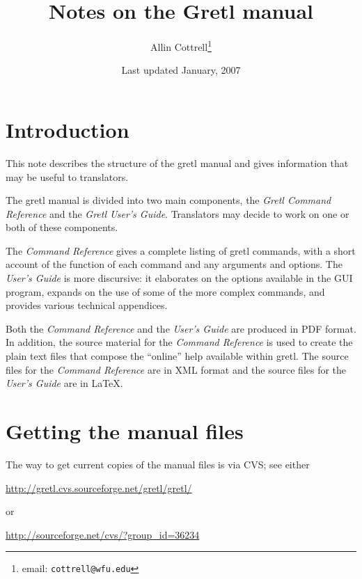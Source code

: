 \documentclass{article}
\begin{document}
\title{Notes on the Gretl manual}
\author{Allin Cottrell\thanks{email: \texttt{cottrell@wfu.edu}}}
\date{Last updated January, 2007}

\maketitle

\setcounter{tocdepth}{1}
\tableofcontents

\section{Introduction}

This note describes the structure of the \textsf{gretl} manual and
gives information that may be useful to translators.

The gretl manual is divided into two main components, the
\textit{Gretl Command Reference} and the \textit{Gretl User's Guide}.
Translators may decide to work on one or both of these components.

The \textit{Command Reference} gives a complete listing of
\textsf{gretl} commands, with a short account of the function of each
command and any arguments and options.  The \textit{User's Guide} is
more discursive: it elaborates on the options available in the GUI
program, expands on the use of some of the more complex commands, and
provides various technical appendices.

Both the \textit{Command Reference} and the \textit{User's Guide} are
produced in PDF format.  In addition, the source material for the
\textit{Command Reference} is used to create the plain text files that
compose the ``online'' help available within \textsf{gretl}.  The
source files for the \textit{Command Reference} are in XML format and
the source files for the \textit{User's Guide} are in \LaTeX.

\section{Getting the manual files}
\label{getit}

The way to get current copies of the manual files is via CVS; see
either 
%
\begin{center}
\url{http://gretl.cvs.sourceforge.net/gretl/gretl/}
\end{center}
%
or 
%
\begin{center}
\url{http://sourceforge.net/cvs/?group_id=36234}
\end{center}
\end{document}
